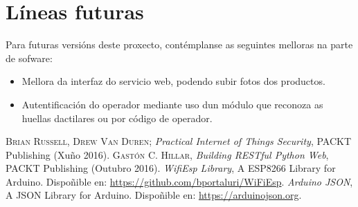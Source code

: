 \documentclass[11pt,twoside]{book}
\begin{document}
\chapter{Líneas futuras}

Para futuras versións deste proxecto, contémplanse as seguintes melloras na parte de sofware:

\begin{itemize}
    \item Mellora da interfaz do servicio web, podendo subir fotos dos productos.
    \item Autentificación do operador mediante uso dun módulo que reconoza as huellas dactilares ou por código de operador.
\end{itemize}


\begin{thebibliography}{99}

 \textsc{Brian Russell, Drew Van Duren}; \textit{Practical Internet of Things Security}, PACKT Publishing (Xuño 2016).
 \textsc{Gastón C. Hillar}, \emph{Building RESTful Python Web}, PACKT Publishing (Outubro 2016).
 \textit{WifiEsp Library}, A ESP8266 Library for Arduino. Dispoñible en: \url{https://github.com/bportaluri/WiFiEsp}.
 \textit{Arduino JSON}, A JSON Library for Arduino. Dispoñible en: \url{https://arduinojson.org}.

					
\end{thebibliography}

\stopcontents[parts]

\cleardoublepage
\renewcommand{\documento}{ANEXOS}
\end{document}

